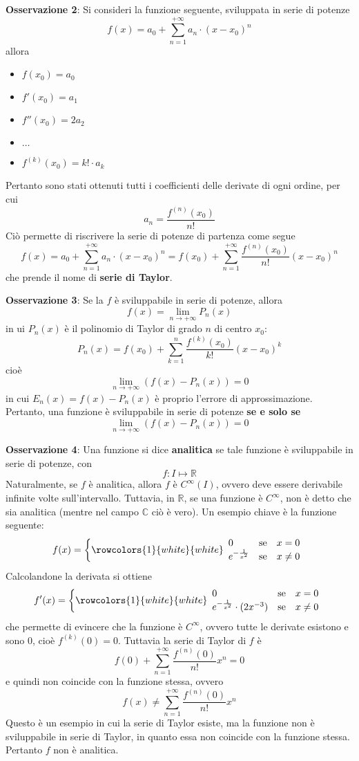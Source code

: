 \documentclass[a4paper]{extarticle}
\begin{document}
\vspace{1em}
\noindent
\textbf{Osservazione 2}: Si consideri la funzione seguente, sviluppata in serie di potenze
\[f(x) = a_0 + \sum_{n=1}^{+\infty} a_n \cdot (x-x_0)^n\]
allora
\begin{itemize}
    \item $f(x_0) = a_0$
    \item $f'(x_0) = a_1$
    \item $f''(x_0)  = 2a_2$
    \item $\dots$
    \item $f^{(k)}(x_0) = k! \cdot a_k $
\end{itemize}
Pertanto sono stati ottenuti tutti i coefficienti delle derivate di ogni ordine, per cui
\[a_n =\frac{f^{(n)}(x_0)}{n!}\]
Ciò permette di riscrivere la serie di potenze di partenza come segue
\[f(x) = a_0+\sum_{n=1}^{+\infty} a_n \cdot (x-x_0)^n = f(x_0) + \sum_{n=1}^{+\infty} \frac{f^{(n)}(x_0)}{n!} (x-x_0)^n\]
che prende il nome di \textbf{serie di Taylor}.

\newpage
\noindent
\textbf{Osservazione 3}: Se la $f$ è sviluppabile in serie di potenze, allora
\[f(x) = \lim_{n \to +\infty} P_n(x)\]
in ui $P_n(x)$ è il polinomio di Taylor di grado $n$ di centro $x_0$:
\[P_n(x) = f(x_0) + \sum_{k=1}^n \frac{f^{(k)}(x_0)}{k!} (x-x_0)^k\]
cioè
\[\lim_{n \to +\infty} \left(f(x) - P_n(x)\right) = 0\]
in cui $E_n(x) = f(x)-P_n(x)$ è proprio l'errore di approssimazione. Pertanto, una funzione è sviluppabile in serie di potenze \textbf{se e solo se}
\[\lim_{n \to +\infty} \left(f(x) - P_n(x)\right) = 0\]

\vspace{2em}
\noindent
\textbf{Osservazione 4}: Una funzione si dice \textbf{analitica} se tale funzione è sviluppabile in serie di potenze, con
\[f : I \longmapsto \mathbb{R}\]
Naturalmente, se $f$ è analitica, allora $f$ è $C^\infty(I)$, ovvero deve essere derivabile infinite volte sull'intervallo. Tuttavia, in $\mathbb{R}$, se una funzione è $C^\infty$, non è detto che sia analitica (mentre nel campo $\mathbb{C}$ ciò è vero). Un esempio chiave è la funzione seguente:
\[f(x) = \left\{
    \rowcolors{1}{white}{white}
    \begin{array}{lll}
        0 & \text{se} & x=0\\
        e^{-\frac{1}{x^2}} & \text{se} & x \neq 0
    \end{array}
\right.\]
Calcolandone la derivata si ottiene
\[f'(x) = \left\{
    \rowcolors{1}{white}{white}
    \begin{array}{lll}
        0 & \text{se} & x=0\\
        e^{-\frac{1}{x^2}} \cdot (2x^{-3}) & \text{se} & x \neq 0
    \end{array}
\right.\]
che permette di evincere che la funzione è $C^\infty$, ovvero tutte le derivate esistono e sono $0$, cioè $f^{(k)}(0)=0$. Tuttavia la serie di Taylor di $f$ è
\[f(0) + \sum_{n=1}^{+\infty} \frac{f^{(n)}(0)}{n!} x^n = 0\]
e quindi non coincide con la funzione stessa, ovvero
\[f(x) \neq \sum_{n=1}^{+\infty} \frac{f^{(n)}(0)}{n!} x^n\]
Questo è un esempio in cui la serie di Taylor esiste, ma la funzione non è sviluppabile in serie di Taylor, in quanto essa non coincide con la funzione stessa. Pertanto $f$ non è analitica.
\end{document}
